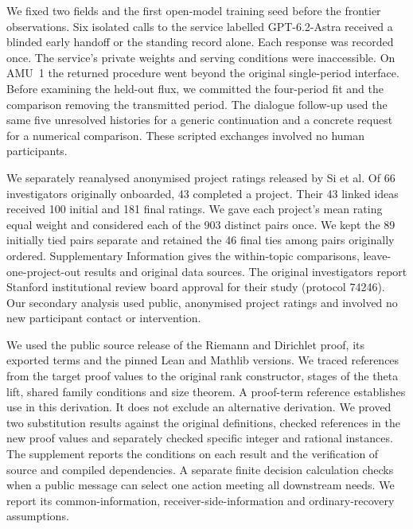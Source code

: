  We fixed two fields and the first open-model training seed before the frontier observations. Six isolated calls to the service labelled GPT-6.2-Astra received a blinded early handoff or the standing record alone. Each response was recorded once. The service's private weights and serving conditions were inaccessible. On AMU~1 the returned procedure went beyond the original single-period interface. Before examining the held-out flux, we committed the four-period fit and the comparison removing the transmitted period. The dialogue follow-up used the same five unresolved histories for a generic continuation and a concrete request for a numerical comparison. These scripted exchanges involved no human participants.

We separately reanalysed anonymised project ratings released by Si et al.\cite{SI26} Of 66 investigators originally onboarded, 43 completed a project. Their 43 linked ideas received 100 initial and 181 final ratings. We gave each project's mean rating equal weight and considered each of the 903 distinct pairs once. We kept the 89 initially tied pairs separate and retained the 46 final ties among pairs originally ordered. Supplementary Information gives the within-topic comparisons, leave-one-project-out results and original data sources. The original investigators report Stanford institutional review board approval for their study (protocol 74246). Our secondary analysis used public, anonymised project ratings and involved no new participant contact or intervention.

 We used the public source release of the Riemann and Dirichlet proof, its exported terms and the pinned Lean and Mathlib versions.\cite{RHSOURCE,SUTHERLAND} We traced references from the target proof values to the original rank constructor, stages of the theta lift, shared family conditions and size theorem. A proof-term reference establishes use in this derivation. It does not exclude an alternative derivation. We proved two substitution results against the original definitions, checked references in the new proof values and separately checked specific integer and rational instances. The supplement reports the conditions on each result and the verification of source and compiled dependencies. A separate finite decision calculation checks when a public message can select one action meeting all downstream needs. We report its common-information, receiver-side-information and ordinary-recovery assumptions.

